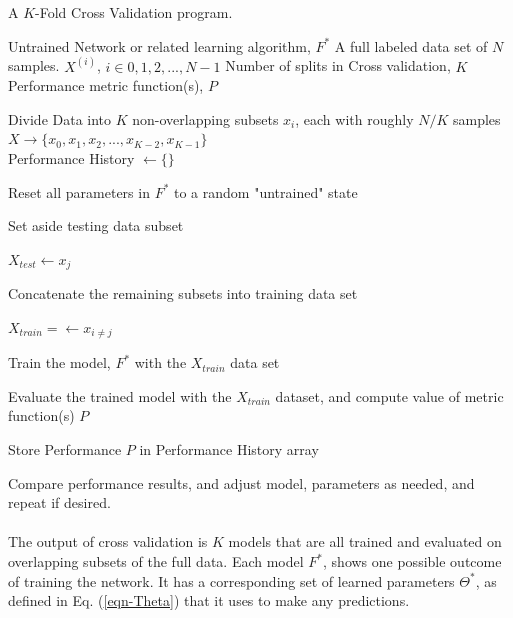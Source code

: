 \documentclass[12pt,letterpaper]{article}
\begin{document}
\begin{algorithm}[H]
\caption{A $K$-Fold Cross Validation program.}
\label{algFeedForward}

\begin{algorithmic}
\REQUIRE Untrained Network or related learning algorithm, $F^*$
\REQUIRE A full labeled data set of $N$ samples. $X^{(i)}$, $i \in {0,1,2,...,N-1}$
\REQUIRE Number of splits in Cross validation, $K$
\REQUIRE Performance metric function(s), $P$

Divide Data into $K$ non-overlapping subsets $x_{i}$, each with roughly $N/K$ samples \\
$X \rightarrow \big\{ x_{0}, x_{1}, x_{2}, ..., x_{K-2},  x_{K-1} \big\}$ \\
Performance History $\leftarrow \{\}$

	\item Reset all parameters in $F^*$ to a random "untrained" state
	\item Set aside testing data subset
	\item $X_{test} \leftarrow x_{j}$
	\item Concatenate the remaining subsets into training data set
	\item $X_{train} =\leftarrow x_{i \neq j}$
	\item Train the model, $F^*$ with the $X_{train}$ data set
	\item Evaluate the trained model with the $X_{train}$ dataset, and compute value of metric function(s) $P$
	\item Store Performance $P$ in Performance History array
\ENDFOR

Compare performance results, and adjust model, parameters as needed, and repeat if desired.

\end{algorithmic}
\end{algorithm}

\paragraph*{}The output of cross validation is $K$ models that are all trained and evaluated on overlapping subsets of the full data. Each model $F^*$, shows one possible outcome of training the network. It has a corresponding set of learned parameters $\Theta^*$, as defined in Eq. (\ref{eqn-Theta}) that it uses to make any predictions. 

\end{document}
